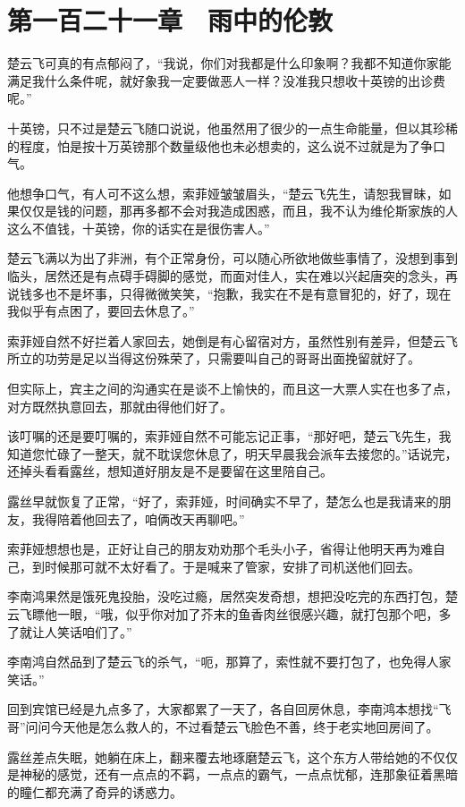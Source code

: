 \section{第一百二十一章　雨中的伦敦}

楚云飞可真的有点郁闷了，“我说，你们对我都是什么印象啊？我都不知道你家能满足我什么条件呢，就好象我一定要做恶人一样？没准我只想收十英镑的出诊费呢。”

十英镑，只不过是楚云飞随口说说，他虽然用了很少的一点生命能量，但以其珍稀的程度，怕是按十万英镑那个数量级他也未必想卖的，这么说不过就是为了争口气。

他想争口气，有人可不这么想，索菲娅皱皱眉头，“楚云飞先生，请恕我冒昧，如果仅仅是钱的问题，那再多都不会对我造成困惑，而且，我不认为维伦斯家族的人这么不值钱，十英镑，你的话实在是很伤害人。”

楚云飞满以为出了非洲，有个正常身份，可以随心所欲地做些事情了，没想到事到临头，居然还是有点碍手碍脚的感觉，而面对佳人，实在难以兴起唐突的念头，再说钱多也不是坏事，只得微微笑笑，“抱歉，我实在不是有意冒犯的，好了，现在我似乎有点困了，要回去休息了。”

索菲娅自然不好拦着人家回去，她倒是有心留宿对方，虽然性别有差异，但楚云飞所立的功劳是足以当得这份殊荣了，只需要叫自己的哥哥出面挽留就好了。

但实际上，宾主之间的沟通实在是谈不上愉快的，而且这一大票人实在也多了点，对方既然执意回去，那就由得他们好了。

该叮嘱的还是要叮嘱的，索菲娅自然不可能忘记正事，“那好吧，楚云飞先生，我知道您忙碌了一整天，就不耽误您休息了，明天早晨我会派车去接您的。”话说完，还掉头看看露丝，想知道好朋友是不是要留在这里陪自己。

露丝早就恢复了正常，“好了，索菲娅，时间确实不早了，楚怎么也是我请来的朋友，我得陪着他回去了，咱俩改天再聊吧。”

索菲娅想想也是，正好让自己的朋友劝劝那个毛头小子，省得让他明天再为难自己，到时候那可就不太好看了。于是喊来了管家，安排了司机送他们回去。

李南鸿果然是饿死鬼投胎，没吃过瘾，居然突发奇想，想把没吃完的东西打包，楚云飞瞟他一眼，“哦，似乎你对加了芥末的鱼香肉丝很感兴趣，就打包那个吧，多了就让人笑话咱们了。”

李南鸿自然品到了楚云飞的杀气，“呃，那算了，索性就不要打包了，也免得人家笑话。”

回到宾馆已经是九点多了，大家都累了一天了，各自回房休息，李南鸿本想找“飞哥”问问今天他是怎么救人的，不过看楚云飞脸色不善，终于老实地回房间了。

露丝差点失眠，她躺在床上，翻来覆去地琢磨楚云飞，这个东方人带给她的不仅仅是神秘的感觉，还有一点点的不羁，一点点的霸气，一点点忧郁，连那象征着黑暗的瞳仁都充满了奇异的诱惑力。

